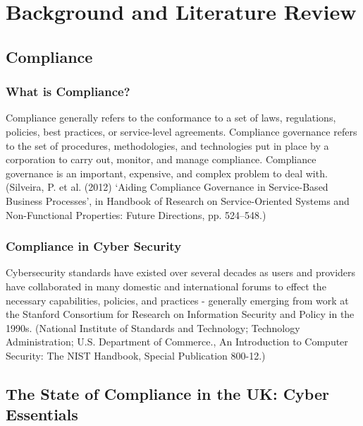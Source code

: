 \chapter{Background and Literature Review} \label{Chapter:two}


\section{Compliance}

    \subsection{What is Compliance?}
        Compliance generally refers to the conformance to a set of laws, regulations, policies, best practices, or service-level agreements. Compliance governance refers to the set of procedures, methodologies, and technologies put in place by a corporation to carry out, monitor, and manage compliance. Compliance governance is an important, expensive, and complex problem to deal with. (Silveira, P. et al. (2012) ‘Aiding Compliance Governance in Service-Based Business Processes’, in Handbook of Research on Service-Oriented Systems and Non-Functional Properties: Future Directions, pp. 524–548.)

    \subsection{Compliance in Cyber Security}
        Cybersecurity standards have existed over several decades as users and providers have collaborated in many domestic and international forums to effect the necessary capabilities, policies, and practices - generally emerging from work at the Stanford Consortium for Research on Information Security and Policy in the 1990s. (National Institute of Standards and Technology; Technology Administration; U.S. Department of Commerce., An Introduction to Computer Security: The NIST Handbook, Special Publication 800-12.)

\section{The State of Compliance in the UK: Cyber Essentials}

